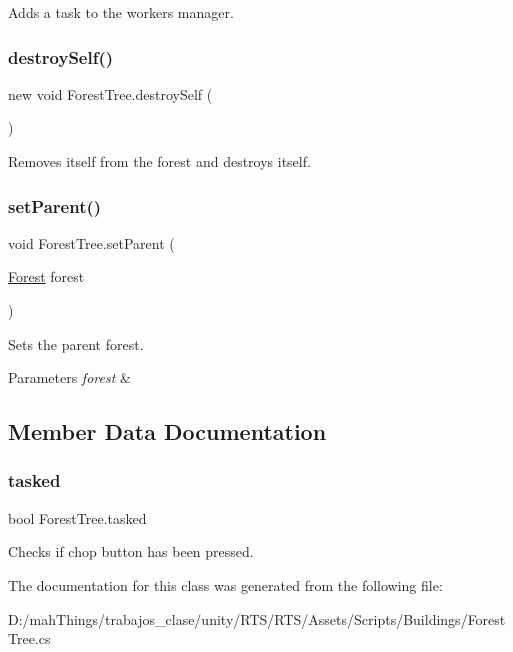 Adds a task to the workers manager. 

\mbox{\label{class_forest_tree_a3c5ea72e5c35e793d3f1afa08e034058}} 
\subsubsection{\texorpdfstring{destroy\+Self()}{destroySelf()}}
{\footnotesize\ttfamily new void Forest\+Tree.\+destroy\+Self (\begin{DoxyParamCaption}{ }\end{DoxyParamCaption})}



Removes itself from the forest and destroys itself. 

\mbox{\label{class_forest_tree_ac7f51574fc6e52629aee4fb8674feb6a}} 
\subsubsection{\texorpdfstring{set\+Parent()}{setParent()}}
{\footnotesize\ttfamily void Forest\+Tree.\+set\+Parent (\begin{DoxyParamCaption}\item[{\mbox{\hyperlink{class_forest}{Forest}}}]{forest }\end{DoxyParamCaption})}



Sets the parent forest. 


\begin{DoxyParams}{Parameters}
{\em forest} & \\
\hline
\end{DoxyParams}


\subsection{Member Data Documentation}
\mbox{\label{class_forest_tree_a2659ff18387589b37c06e7b78d53d057}} 
\subsubsection{\texorpdfstring{tasked}{tasked}}
{\footnotesize\ttfamily bool Forest\+Tree.\+tasked}



Checks if chop button has been pressed. 



The documentation for this class was generated from the following file\+:\begin{DoxyCompactItemize}
\item 
D\+:/mah\+Things/trabajos\+\_\+clase/unity/\+R\+T\+S/\+R\+T\+S/\+Assets/\+Scripts/\+Buildings/Forest\+Tree.\+cs\end{DoxyCompactItemize}
